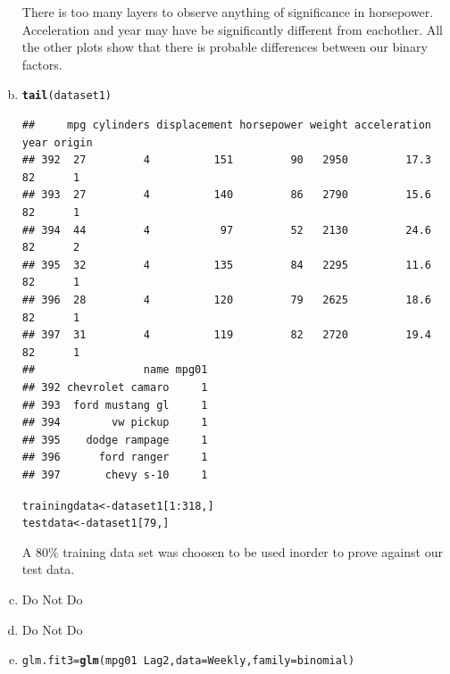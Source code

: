 \documentclass{article}\usepackage[]{graphicx}\usepackage[]{color}
\makeatletter
\newcommand{\hlnum}[1]{\textcolor[rgb]{0.686,0.059,0.569}{#1}}%
\newcommand{\hlopt}[1]{\textcolor[rgb]{0,0,0}{#1}}%
\newcommand{\hlstd}[1]{\textcolor[rgb]{0.345,0.345,0.345}{#1}}%
\newcommand{\hlkwb}[1]{\textcolor[rgb]{0.69,0.353,0.396}{#1}}%
\newcommand{\hlkwc}[1]{\textcolor[rgb]{0.333,0.667,0.333}{#1}}%
\newcommand{\hlkwd}[1]{\textcolor[rgb]{0.737,0.353,0.396}{\textbf{#1}}}%
\newenvironment{kframe}{%
 \def\at@end@of@kframe{}%
 \ifinner\ifhmode%
  \def\at@end@of@kframe{\end{minipage}}%
  \begin{minipage}{\columnwidth}%
 \fi\fi%
 \def\FrameCommand##1{\hskip\@totalleftmargin \hskip-\fboxsep
 \colorbox{shadecolor}{##1}\hskip-\fboxsep
     \hskip-\linewidth \hskip-\@totalleftmargin \hskip\columnwidth}%
 \MakeFramed {\advance\hsize-\width
   \@totalleftmargin\z@ \linewidth\hsize
   \@setminipage}}%
 {\par\unskip\endMakeFramed%
 \at@end@of@kframe}
\newenvironment{knitrout}{}{} %
\makeatother
\begin{document}
\begin{enumerate}[(a)]
There is too many layers to observe anything of significance in horsepower. Acceleration and year may have be significantly different from eachother. All the other plots show that there is probable differences between our binary factors.
\item
\begin{knitrout}
\color{fgcolor}\begin{kframe}
\begin{alltt}
\hlkwd{tail}\hlstd{(dataset1)}
\end{alltt}
\begin{verbatim}
##     mpg cylinders displacement horsepower weight acceleration year origin
## 392  27         4          151         90   2950         17.3   82      1
## 393  27         4          140         86   2790         15.6   82      1
## 394  44         4           97         52   2130         24.6   82      2
## 395  32         4          135         84   2295         11.6   82      1
## 396  28         4          120         79   2625         18.6   82      1
## 397  31         4          119         82   2720         19.4   82      1
##                 name mpg01
## 392 chevrolet camaro     1
## 393  ford mustang gl     1
## 394        vw pickup     1
## 395    dodge rampage     1
## 396      ford ranger     1
## 397       chevy s-10     1
\end{verbatim}
\begin{alltt}
\hlstd{trainingdata}\hlkwb{<-}\hlstd{dataset1[}\hlnum{1}\hlopt{:}\hlnum{318}\hlstd{,]}
\hlstd{testdata}\hlkwb{<-}\hlstd{dataset1[}\hlnum{79}\hlstd{,]}
\end{alltt}
\end{kframe}
\end{knitrout}
A $80\%$ training data set was choosen to be used inorder to prove against our test data.

\item
Do Not Do
\item
Do Not Do
\item
\begin{knitrout}
\color{fgcolor}\begin{kframe}
\begin{alltt}
\hlstd{glm.fit3}\hlkwb{=}\hlkwd{glm}\hlstd{(mpg01}\hlopt{~}\hlstd{Lag2,}\hlkwc{data}\hlstd{=Weekly,} \hlkwc{family} \hlstd{= binomial)}
\end{alltt}



\end{kframe}
\end{knitrout}
\end{enumerate}
\end{document}
